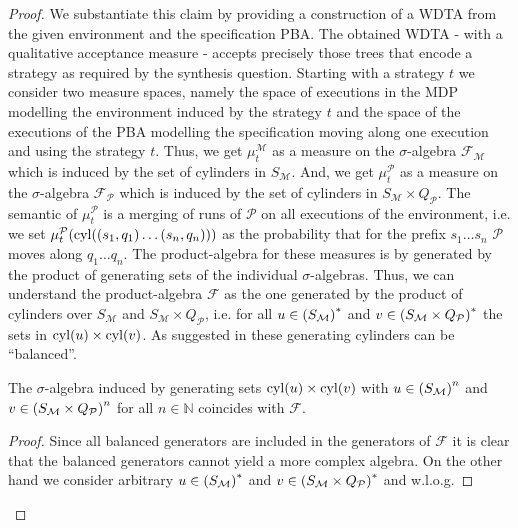 \begin{proof}
We substantiate this claim by providing a construction of a \ac{WDTA} from the
given environment and the specification \ac{PBA}. The obtained \ac{WDTA} - with
a qualitative acceptance measure - accepts precisely those trees that encode a
strategy as required by the synthesis question.
Starting with a strategy $t$ we consider two measure spaces, namely the space
of executions in the \ac{MDP} modelling the environment induced by the strategy
$t$ and the space of the executions of the \ac{PBA} modelling the
specification moving along one execution and using the strategy $t$.
Thus, we get $\mu^{\mathcal{M}}_{t}$ as a measure on the $\sigma$-algebra
$\mathcal{F}_{\mathcal{M}}$ which is induced by the set of cylinders in
$S_{\mathcal{M}}$. And, we get $\mu^{\mathcal{P}}_{t}$ as a measure on the
$\sigma$-algebra $\mathcal{F}_{\mathcal{P}}$ which is induced
by the set of cylinders in $S_{\mathcal{M}}\times Q_{\mathcal{P}}$. The
semantic of $\mu^{\mathcal{P}}_{t}$ is a merging of runs of
$\mathcal{P}$ on all executions of the environment, i.e. we set
$\mu^{\mathcal{P}}_{t}(\operatorname{cyl}(\left(s_{1}, q_{1}\right)\dots\left(s_{n}, q_{n}\right)))$
as the probability that for the prefix $s_{1}\dots s_{n}$ $\mathcal{P}$
moves along $q_{1}\dots q_{n}$. The product-algebra for these measures is
by \cite[Theorem 22.1]{Bauer} generated by the product of generating sets of
the individual $\sigma$-algebras. Thus, we can understand the product-algebra
$\mathcal{F}$ as the one generated by the product of cylinders over
$S_{\mathcal{M}}$ and $S_{\mathcal{M}}\times Q_{\mathcal{P}}$, i.e. for all
$u\in \left(S_{\mathcal{M}}\right)^{*}$ and
$v\in \left(S_{\mathcal{M}}\times Q_{\mathcal{P}}\right)^{*}$ the sets in
$\operatorname{cyl}(u)\times\operatorname{cyl}(v)$. As suggested in \cite[Remark 35]{RandAutoInfTrees}
these generating cylinders can be \enquote{balanced}.
\begin{lemma}
  The $\sigma$-algebra induced by generating sets $\operatorname{cyl}(u)\times\operatorname{cyl}(v)$ with
  $u\in \left(S_{\mathcal{M}}\right)^{n}$ and
  $v\in \left(S_{\mathcal{M}}\times Q_{\mathcal{P}}\right)^{n}$ for all
  $n\in\mathbb{N}$ coincides with $\mathcal{F}$.
  \label{lem:balanced}
\end{lemma}
\begin{proof}
  Since all balanced generators are included in the generators of $\mathcal{F}$
  it is clear that the balanced generators cannot yield a more complex algebra.
  On the other hand we consider arbitrary $u\in \left(S_{\mathcal{M}}\right)^{*}$
  and $v\in \left(S_{\mathcal{M}}\times Q_{\mathcal{P}}\right)^{*}$ and w.l.o.g.

\end{proof}
\end{proof}
